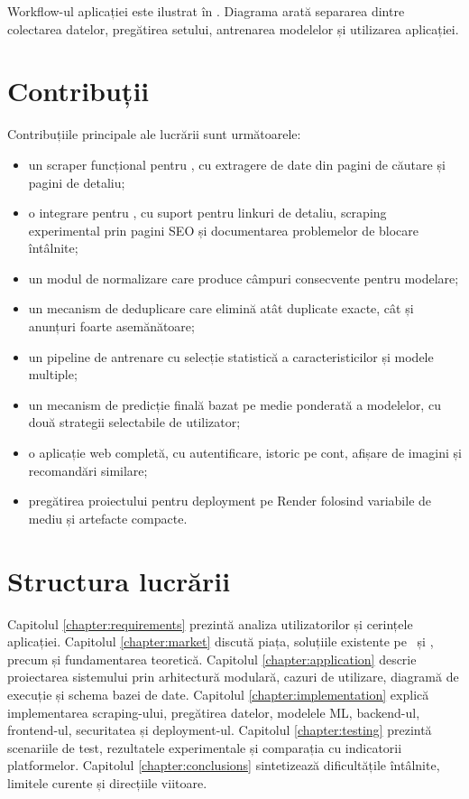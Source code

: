 Workflow-ul aplicației este ilustrat în . Diagrama arată separarea dintre colectarea datelor, pregătirea setului, antrenarea modelelor și utilizarea aplicației.


\section{Contribuții}
\label{sec:intro-contributions}

Contribuțiile principale ale lucrării sunt următoarele:

\begin{itemize}
    \item un scraper funcțional pentru \autovit, cu extragere de date din pagini de căutare și pagini de detaliu;
    \item o integrare pentru \mobilede, cu suport pentru linkuri de detaliu, scraping experimental prin pagini SEO și documentarea problemelor de blocare întâlnite;
    \item un modul de normalizare care produce câmpuri consecvente pentru modelare;
    \item un mecanism de deduplicare care elimină atât duplicate exacte, cât și anunțuri foarte asemănătoare;
    \item un pipeline de antrenare cu selecție statistică a caracteristicilor și modele multiple;
    \item un mecanism de predicție finală bazat pe medie ponderată a modelelor, cu două strategii selectabile de utilizator;
    \item o aplicație web completă, cu autentificare, istoric pe cont, afișare de imagini și recomandări similare;
    \item pregătirea proiectului pentru deployment pe Render folosind variabile de mediu și artefacte compacte.
\end{itemize}

\section{Structura lucrării}
\label{sec:intro-structure}

Capitolul \ref{chapter:requirements} prezintă analiza utilizatorilor și cerințele aplicației. Capitolul \ref{chapter:market} discută piața, soluțiile existente pe \autovit\ și \mobilede, precum și fundamentarea teoretică. Capitolul \ref{chapter:application} descrie proiectarea sistemului prin arhitectură modulară, cazuri de utilizare, diagramă de execuție și schema bazei de date. Capitolul \ref{chapter:implementation} explică implementarea scraping-ului, pregătirea datelor, modelele ML, backend-ul, frontend-ul, securitatea și deployment-ul. Capitolul \ref{chapter:testing} prezintă scenariile de test, rezultatele experimentale și comparația cu indicatorii platformelor. Capitolul \ref{chapter:conclusions} sintetizează dificultățile întâlnite, limitele curente și direcțiile viitoare.
